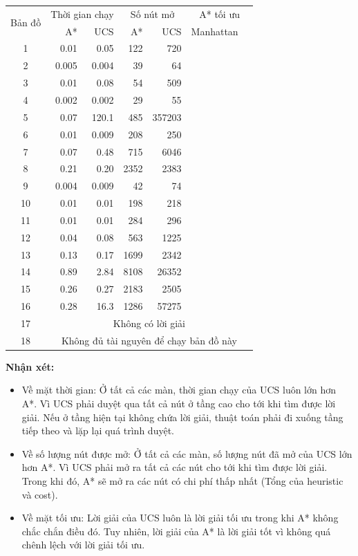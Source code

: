 \documentclass[12pt, letterpaper]{article}
\begin{document}
\begin{center}
	\begin{tabular}{c|r r r r c c}
		\multirow{2}{*}{Bản đồ} &  \multicolumn{2}{c}{Thời gian chạy} & \multicolumn{2}{c}{Số nút mở} & \multicolumn{2}{c}{A* tối ưu} \\
		\cmidrule{2-7}
		& A*     & UCS & A*     & UCS & Manhattan \\
		\midrule
		1      & 0.01 & 0.05   & 122  & 720 & {\checkmark} \\
		2      & 0.005 & 0.004   & 39   & 64     & {\checkmark} \\
		3      & 0.01 & 0.08   & 54   & 509    & {\checkmark} \\
		4      & 0.002 & 0.002   & 29   & 55     & {\checkmark} \\
		5      & 0.07 & 120.1 & 485  & 357203   & {\checkmark} \\
		6      & 0.01 & 0.009   & 208  & 250    & {\checkmark} \\
		7      & 0.07 & 0.48   & 715  & 6046   & {\checkmark} \\
		8      & 0.21 & 0.20   & 2352 & 2383   & {\checkmark} \\
		9      & 0.004 & 0.009   & 42   & 74     & {\checkmark} \\
		10     & 0.01 & 0.01   & 198  & 218    & {\checkmark} \\
		11     & 0.01 & 0.01   & 284  & 296    & {\checkmark} \\
		12     & 0.04 & 0.08   & 563  & 1225   & {\checkmark} \\
		13     & 0.13 & 0.17   & 1699 & 2342   & {\checkmark} \\
		14     & 0.89 & 2.84   & 8108 & 26352  & {\checkmark} \\
		15     & 0.26 & 0.27   & 2183 & 2505   & {\checkmark} \\
		16     & 0.28 & 16.3  & 1286 & 57275  \\
		17     & \multicolumn{6}{c}{Không có lời giải}       \\
		18     & \multicolumn{6}{c}{Không đủ tài nguyên để chạy bản đồ này}       \\
	\end{tabular}
\end{center}

\textbf{Nhận xét:} \\
\begin{itemize}
	\item Về mặt thời gian: Ở tất cả các màn, thời gian chạy của UCS luôn lớn hơn
	A*. Vì UCS phải duyệt qua tất cả nút ở tầng cao cho tới khi tìm được lời giải.
	Nếu ở tầng hiện tại không chứa lời giải, thuật toán phải đi xuống tầng tiếp
	theo và lặp lại quá trình duyệt.
	\item Về số lượng nút được mở: Ở tất cả các màn, số lượng nút đã mở của UCS
	lớn hơn A*. Vì UCS phải mở ra tất cả các nút cho tới khi tìm được lời giải. Trong khi đó, A* sẽ mở ra các nút có chi phí thấp nhất (Tổng của heuristic và cost).
	\item Về mặt tối ưu: Lời giải của UCS luôn là lời giải tối ưu trong khi A* không
	chắc chắn điều đó. Tuy nhiên, lời giải của A* là lời giải tốt vì không quá
	chênh lệch với lời giải tối ưu.
\end{itemize}
\end{document}
